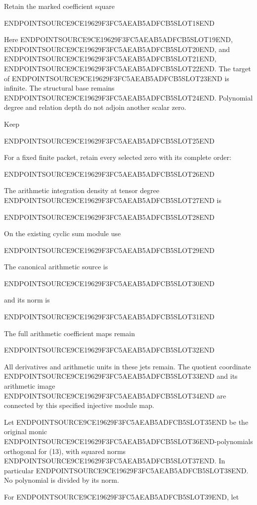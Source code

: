 Retain the marked coefficient square

ENDPOINTSOURCE9CE19629F3FC5AEAB5ADFCB5SLOT18END

Here ENDPOINTSOURCE9CE19629F3FC5AEAB5ADFCB5SLOT19END, ENDPOINTSOURCE9CE19629F3FC5AEAB5ADFCB5SLOT20END, and ENDPOINTSOURCE9CE19629F3FC5AEAB5ADFCB5SLOT21END, ENDPOINTSOURCE9CE19629F3FC5AEAB5ADFCB5SLOT22END. The target of ENDPOINTSOURCE9CE19629F3FC5AEAB5ADFCB5SLOT23END is infinite. The structural base remains ENDPOINTSOURCE9CE19629F3FC5AEAB5ADFCB5SLOT24END. Polynomial degree and relation depth do not adjoin another scalar zero.

Keep

ENDPOINTSOURCE9CE19629F3FC5AEAB5ADFCB5SLOT25END

For a fixed finite packet, retain every selected zero with its complete order:

ENDPOINTSOURCE9CE19629F3FC5AEAB5ADFCB5SLOT26END

The arithmetic integration density at tensor degree ENDPOINTSOURCE9CE19629F3FC5AEAB5ADFCB5SLOT27END is

ENDPOINTSOURCE9CE19629F3FC5AEAB5ADFCB5SLOT28END

On the existing cyclic sum module use

ENDPOINTSOURCE9CE19629F3FC5AEAB5ADFCB5SLOT29END

The canonical arithmetic source is

ENDPOINTSOURCE9CE19629F3FC5AEAB5ADFCB5SLOT30END

and its norm is

ENDPOINTSOURCE9CE19629F3FC5AEAB5ADFCB5SLOT31END

The full arithmetic coefficient maps remain

ENDPOINTSOURCE9CE19629F3FC5AEAB5ADFCB5SLOT32END

All derivatives and arithmetic units in these jets remain. The quotient coordinate ENDPOINTSOURCE9CE19629F3FC5AEAB5ADFCB5SLOT33END and its arithmetic image ENDPOINTSOURCE9CE19629F3FC5AEAB5ADFCB5SLOT34END are connected by this specified injective module map.

Let ENDPOINTSOURCE9CE19629F3FC5AEAB5ADFCB5SLOT35END be the original monic ENDPOINTSOURCE9CE19629F3FC5AEAB5ADFCB5SLOT36END-polynomials orthogonal for (13), with squared norms ENDPOINTSOURCE9CE19629F3FC5AEAB5ADFCB5SLOT37END. In particular ENDPOINTSOURCE9CE19629F3FC5AEAB5ADFCB5SLOT38END. No polynomial is divided by its norm.

For ENDPOINTSOURCE9CE19629F3FC5AEAB5ADFCB5SLOT39END, let

